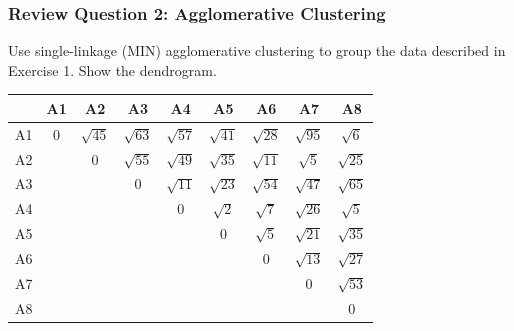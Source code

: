 \documentclass[aspectratio=169, 10pt]{beamer}
\begin{document}
\begin{frame}[t]
    \frametitle{Review Question 2: Agglomerative Clustering}
    \small
    Use single-linkage (MIN) agglomerative clustering to group the data described in Exercise 1. Show the dendrogram.
    \begin{table}[]
        \scriptsize
        \begin{tabular}{c|cccccccc}
           & A1 & A2 & A3 & A4 & A5 & A6 & A7 & A8 \\ \hline
        A1 & $0$  & $\sqrt{45}$ & $\sqrt{63}$ & $\sqrt{57}$ & $\sqrt{41}$ & $\sqrt{28}$ & $\sqrt{95}$ & $\sqrt{6}$ \\
        A2 &    & $0$  & $\sqrt{55}$ & $\sqrt{49}$ & $\sqrt{35}$ & $\sqrt{11}$ & $\sqrt{5}$  & $\sqrt{25}$ \\
        A3 &    &    & $0$  & $\sqrt{11}$ & $\sqrt{23}$ & $\sqrt{54}$ & $\sqrt{47}$ & $\sqrt{65}$ \\
        A4 &    &    &    & $0$  & $\sqrt{2}$  & $\sqrt{7}$  & $\sqrt{26}$ & $\sqrt{5}$  \\
        A5 &    &    &    &    & $0$  & $\sqrt{5}$  & $\sqrt{21}$ & $\sqrt{35}$ \\
        A6 &    &    &    &    &    & $0$  & $\sqrt{13}$ & $\sqrt{27}$ \\
        A7 &    &    &    &    &    &    & $0$  & $\sqrt{53}$ \\
        A8 &    &    &    &    &    &    &    & $0$ \\
        \end{tabular}
        \end{table}

\end{frame}
\end{document}
